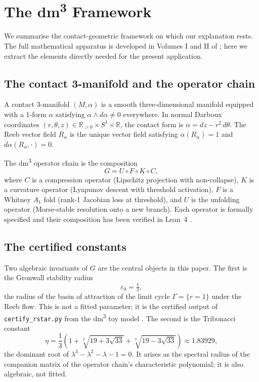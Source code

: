 \documentclass[11pt,a4paper]{article}
\theoremstyle{definition}
\theoremstyle{remark}
\begin{document}
\section{The dm\textsuperscript{3} Framework}
\label{sec:framework}

We summarise the contact-geometric framework on which our explanation rests. The full mathematical apparatus is developed in Volumes I and II of \citet{principia2026}; here we extract the elements directly needed for the present application.

\subsection{The contact 3-manifold and the operator chain}

A contact 3-manifold $(M, \alpha)$ is a smooth three-dimensional manifold equipped with a 1-form $\alpha$ satisfying $\alpha \wedge d\alpha \neq 0$ everywhere. In normal Darboux coordinates $(r, \theta, z) \in \mathbb{R}_{>0} \times S^1 \times \mathbb{R}$, the contact form is $\alpha = dz - r^2\,d\theta$. The Reeb vector field $R_\alpha$ is the unique vector field satisfying $\alpha(R_\alpha) = 1$ and $d\alpha(R_\alpha, \cdot) = 0$.

The dm\textsuperscript{3} operator chain is the composition
\begin{equation}
G = U \circ F \circ K \circ C,
\label{eq:chain}
\end{equation}
where $C$ is a compression operator (Lipschitz projection with non-collapse), $K$ is a curvature operator (Lyapunov descent with threshold activation), $F$ is a Whitney $A_1$ fold (rank-1 Jacobian loss at threshold), and $U$ is the unfolding operator (Morse-stable resolution onto a new branch). Each operator is formally specified and their composition has been verified in Lean~4 \citep{AXLE2026}.

\subsection{The certified constants}

Two algebraic invariants of $G$ are the central objects in this paper. The first is the Gronwall stability radius
\begin{equation}
\varepsilon_0 = \tfrac{1}{3},
\end{equation}
the radius of the basin of attraction of the limit cycle $\Gamma = \{r = 1\}$ under the Reeb flow. This is not a fitted parameter; it is the certified output of \texttt{certify\_rstar.py} from the dm\textsuperscript{3} toy model \citep{principia2026}. The second is the Tribonacci constant
\begin{equation}
\eta = \frac{1}{3}\left(1 + \sqrt[3]{19 + 3\sqrt{33}} + \sqrt[3]{19 - 3\sqrt{33}}\right) \approx 1.83929,
\end{equation}
the dominant root of $\lambda^3 - \lambda^2 - \lambda - 1 = 0$. It arises as the spectral radius of the companion matrix of the operator chain's characteristic polynomial; it is also algebraic, not fitted.
\end{document}
